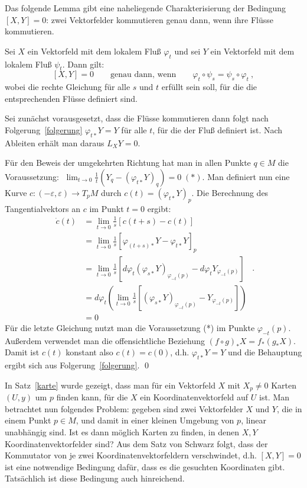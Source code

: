 \documentclass[%
	paper=a5,%
	fleqn,%
	DIV=18,%
	BCOR=0mm,
	fontsize=11pt,
	titlepage=false,%
	bibliography=totoc,
	DIV=18,%
	twoside=true,
	pdftitle=Riemannsche Geometrie,
	pdfauthor=Uwe Semmelmann,
	numbers=noendperiod]%
	{scrbook}
\begin{document}
\bigskip

Das folgende Lemma gibt eine naheliegende Charakterisierung der Bedingung $[X,Y]=0$:
zwei Vektorfelder kommutieren genau dann, wenn ihre Fl\"usse kommutieren.

\begin{Lemma}\label{kommutator}
Sei $X$ ein Vektorfeld mit dem lokalem Flu\ss{} $\varphi_t$ und sei $Y$ ein Vektorfeld mit
dem lokalem Flu\ss{} $\psi_t$. Dann gilt:
$$
[X, Y] = 0 \qquad \mbox{genau dann, wenn} \qquad \varphi_t \circ \psi_s = \psi_s\circ \varphi_t \ ,
$$
wobei die rechte Gleichung f\"ur alle $s$ und $t$ erf\"ullt sein soll, f\"ur die die entsprechenden
Fl\"usse definiert sind.\fish
\end{Lemma}
\proof
Sei zun\"achst vorausgesetzt, dass die Fl\"usse kommutieren dann folgt nach Folgerung~\ref{folgerung}
$\varphi_{t*} Y = Y$ f\"ur alle $t$, f\"ur die der Flu\ss{} definiert ist. Nach Ableiten erh\"alt man
daraus $L_XY=0$.

\medskip

F\"ur den Beweis der umgekehrten Richtung hat man in allen Punkte $q\in M$ die Voraussetzung:
$\;\lim_{t\rightarrow 0} \frac1t(Y_q - (\varphi_{t*}Y)_q) = 0 \; (\ast)$. Man definiert nun eine Kurve
$c : (-\varepsilon, \varepsilon)\rightarrow T_pM$ durch $c(t) = (\varphi_{t*}Y)_p$.
Die Berechnung des Tangentialvektors an $c$ im Punkt $t=0$ ergibt:
$$
\begin{array}{rl}
\dot c(t) & = \lim_{t\rightarrow 0} \frac1s [c(t+s)-c(t)]\\[1ex]
& = \lim_{t\rightarrow 0} \frac1s [\varphi_{(t+s)*}Y - \varphi_{t*}Y]_p\\[1ex]
& = \lim_{t\rightarrow 0} \frac1s [d\varphi_t (\varphi_{s*}Y)_{\varphi_{-t}(p)} -  d\varphi_t Y_{\varphi_{-t}(p)}]\\[1ex]
& = d\varphi_t \left(  \lim_{t\rightarrow 0} \frac1s   [(\varphi_{s*}Y)_{\varphi_{-t}(p)} - Y_{\varphi_{-t}(p)} ]\right)\\[1ex]
& = 0
\end{array} \ .
$$
F\"ur die letzte Gleichung nutzt man die Voraussetzung (*) im Punkte $\varphi_{-t}(p)$. Au\ss erdem
verwendet man die offensichtliche Beziehung $(f\circ g)_* X = f_* (g_*X)$. Damit ist $c(t)$
konstant also $c(t) = c(0)$, d.h. $\varphi_{t\ast}Y = Y$ und die Behauptung ergibt sich aus
Folgerung~\ref{folgerung}.
\qed

\bigskip

In Satz~\ref{karte} wurde gezeigt, dass man f\"ur ein Vektorfeld $X$ mit $X_p\neq 0$
Karten $(U,y)$ um $p$ finden kann, f\"ur die $X$ ein Koordinatenvektorfeld auf $U$ ist.
Man betrachtet nun folgendes Problem: gegeben sind zwei Vektorfelder $X$ und $Y$, die in
einem Punkt $p\in M$, und damit in einer kleinen Umgebung von $p$, linear unabh\"angig sind.
Ist es dann m\"oglich Karten zu finden, in denen $X, Y$ Koordinatenvektorfelder sind?
Aus dem Satz von Schwarz folgt, dass der Kommutator von je zwei Koordinatenvektorfeldern
verschwindet, d.h. $[X,Y]=0$ ist eine notwendige Bedingung daf\"ur, dass es die gesuchten Koordinaten gibt.
Tats\"achlich ist diese Bedingung auch hinreichend.
\end{document}
